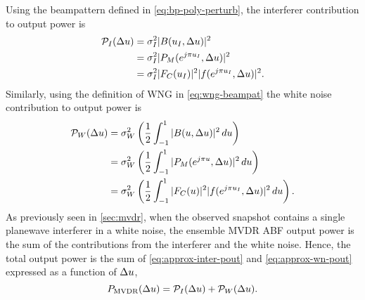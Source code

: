 Using the beampattern defined in \eqref{eq:bp-poly-perturb}, the interferer contribution to output power is
\begin{align} 
  \label{eq:approx-inter-pout}
  \mathcal{P}_I(\Delta u) &= \sigma_I^2|B(u_I, \Delta u)|^2 \nonumber \\
&= \sigma_I^2|{P}_M(e^{j\pi u_I}, \Delta u)|^2 \nonumber \\
&= \sigma_I^2|F_C(u_I)|^2 |f(e^{j\pi u_I}, \Delta u) |^2.
\end{align}
Similarly, using the definition of WNG in \eqref{eq:wng-beampat} the white noise contribution to output power is
\begin{align} 
\label{eq:approx-wn-pout}
  \mathcal{P}_W(\Delta u) &= \sigma^2_W\left(\frac{1}{2}\int_{-1}^{1}|B(u, \Delta u)|^2\, du\right) \nonumber \\
&= \sigma^2_W\left(\frac{1}{2}\int_{-1}^{1}|{P}_M(e^{j\pi u}, \Delta u)|^2\, du\right) \nonumber \\
&= \sigma^2_W\left(\frac{1}{2}\int_{-1}^{1} |F_C(u)|^2 |f(e^{j\pi u_I}, \Delta u) |^2\, du\right).
\end{align}
As previously seen in \sect{}\ref{sec:mvdr}, when the observed
snapshot contains a single planewave interferer in a white noise, the
ensemble MVDR ABF output power is the sum of the contributions from
the interferer and the white noise. Hence, the total output power is
the sum of \eqref{eq:approx-inter-pout} and \eqref{eq:approx-wn-pout}
expressed as a function of $\Delta u$,
\begin{equation}
  \label{eq:pout-deltau}
  P_{\rm MVDR}(\Delta u) = \mathcal{P}_I(\Delta u) + \mathcal{P}_W(\Delta u).  
\end{equation}

